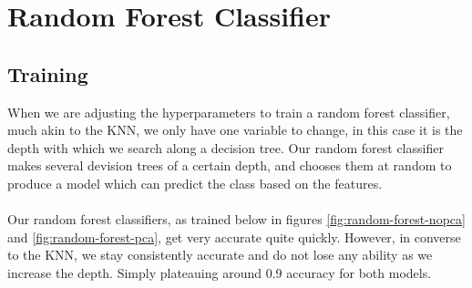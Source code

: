 \documentclass[12pt,a4paper]{article}
\begin{document}
    \clearpage
    \section{Random Forest Classifier}
    \subsection{Training}
    When we are adjusting the hyperparameters to train a random forest classifier, much akin
    to the KNN, we only have one variable to change, in this case it is the depth with 
    which we search along a decision tree. Our random forest classifier makes several devision
    trees of a certain depth, and chooses them at random to produce a model which can predict
    the class based on the features.
    \\
    \\
    Our random forest classifiers, as trained below in figures \ref{fig:random-forest-nopca} and
    \ref{fig:random-forest-pca}, get very accurate quite quickly. However, in converse to
    the KNN, we stay consistently accurate and do not lose any ability as we increase the
    depth. Simply plateauing around 0.9 accuracy for both models. 
\end{document}
